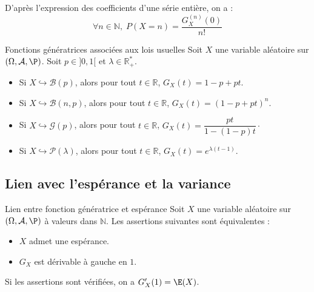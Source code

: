 \documentclass[french,11pt,twoside]{VcCours}
\begin{document}
\begin{Remarque}{} D'après l'expression des coefficients d'une série entière, on a :
$$ \forall n \in \mathbb{N}, \; P(X=n) = \dfrac{G_X^{(n)}(0)}{n!}$$
\end{Remarque}

\begin{Proposition}{Fonctions génératrices associées aux lois usuelles}
Soit $X$ une variable aléatoire sur $(\Omega, \mathcal{A}, \P)$. Soit $p \in ]0,1[$ et $\lambda \in \mathbb{R}_+^{*}$.

\begin{itemize}
\item Si $X \hookrightarrow \mathcal{B}(p)$, alors pour tout $t \in \mathbb{R}$, $G_X(t)=1-p+pt$.
\item Si $X \hookrightarrow \mathcal{B}(n,p)$,  alors pour tout $t \in \mathbb{R}$, $G_X(t)=(1-p+pt)^n$.
\item Si $X \hookrightarrow \mathcal{G}(p)$,  alors pour tout $t \in \mathbb{R}$, $G_X(t)=\dfrac{pt}{1-(1-p)t}\cdot$
\item Si $X \hookrightarrow \mathcal{P}(\lambda)$,  alors pour tout $t \in \mathbb{R}$, $G_X(t)=e^{\lambda(t-1)}$.
\end{itemize}
\end{Proposition}

\begin{Demonstration}{}

\newpage

\vspace*{10cm}
\end{Demonstration}

\subsection{Lien avec l'espérance et la variance}

\begin{Proposition}{Lien entre fonction génératrice et espérance} Soit $X$ une variable aléatoire sur $(\Omega, \mathcal{A}, \P)$ à valeurs dans $\mathbb{N}$. Les assertions suivantes sont équivalentes :

\begin{itemize}
\item $X$ admet une espérance.
\item $G_X$ est dérivable à gauche en $1$.
\end{itemize}
Si les assertions sont vérifiées, on a $G_X'(1)=\E(X)$.
\end{Proposition}
\end{document}
